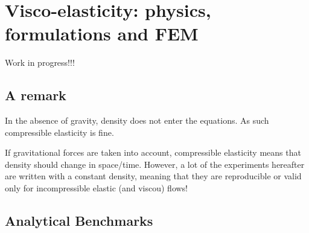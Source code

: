 \chapter{Visco-elasticity: physics, formulations and FEM } %


{\Large Work in progress!!!}

\section{A remark}

In the absence of gravity, density does not enter the equations. 
As such compressible elasticity is fine. 

If gravitational forces are taken into account, compressible elasticity
means that density should change in space/time. However, 
a lot of the experiments hereafter are written with a constant density, 
meaning that they are reproducible or valid only for incompressible elastic (and viscou) flows!

\section{Analytical Benchmarks}

